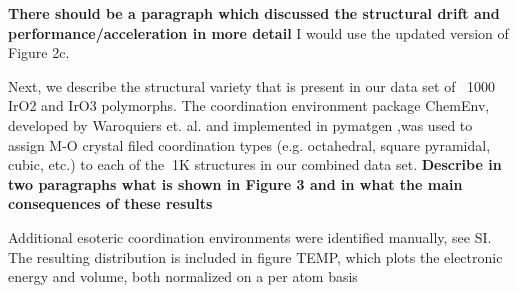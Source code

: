 %


{\bf There should be a paragraph which discussed the structural drift and performance/acceleration in more detail}
I would use the updated version of Figure 2c.


Next, we describe the structural variety that is present in our data set of ~1000 IrO2 and IrO3 polymorphs.
The coordination environment package ChemEnv, developed by Waroquiers et. al. \cite{Waroquiers2017} and implemented in pymatgen \cite{Ong2013},was used to assign M-O crystal filed coordination types (e.g. octahedral, square pyramidal, cubic, etc.) to each of the $~$1K structures in our combined data set.
{\bf Describe in two paragraphs what is shown in Figure 3 and in what the main consequences of these results}

%
Additional esoteric coordination environments were identified manually, see SI.
The resulting distribution is included in figure TEMP, which plots the electronic energy and volume, both normalized on a per atom basis



